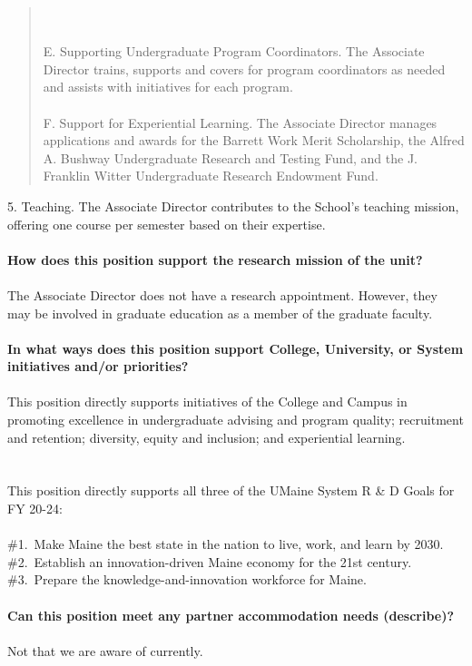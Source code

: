 \documentclass[11pt]{article}
\begin{document}
\begin{quote}
\\~\\
E. Supporting Undergraduate Program Coordinators. The Associate Director trains, supports and covers for program coordinators as needed and assists with initiatives for each program.
\\~\\
F. Support for Experiential Learning. The Associate Director manages applications and awards for the Barrett Work Merit Scholarship, the Alfred A. Bushway Undergraduate Research and Testing Fund, and the J. Franklin Witter Undergraduate Research Endowment Fund.\\
\end{quote}
5. Teaching.  The Associate Director contributes to the School’s teaching mission, offering one course per semester based on their expertise. 
\\~\\
\textbf{\rmfamily How does this position support the research mission of the unit?}\\~\\
The Associate Director does not have a research appointment. However, they may be involved in graduate education as a member of the graduate faculty.
\\~\\
\textbf{\rmfamily In what ways does this position support College, University, or System initiatives and/or priorities?}
\\~\\
This position directly supports initiatives of the College and Campus in promoting excellence in undergraduate advising and program quality; recruitment and retention; diversity, equity and inclusion; and experiential learning. \\
\\~\\
This position directly supports all three of the UMaine System R \& D Goals for FY 20-24:\\~\\
\#1.~Make Maine the best state in the nation to live, work, and learn by 2030. \\
\#2.~Establish an innovation-driven Maine economy for the 21st century.\\
\#3.~Prepare the knowledge-and-innovation workforce for Maine.\\~\\
\vfill
\noindent\textbf{\rmfamily Can this position meet any partner accommodation needs (describe)?}
\\~\\Not that we are aware of currently.\\~\\
\end{document}
